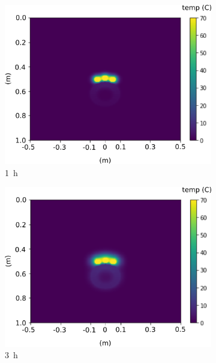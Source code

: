\documentclass[Journal,letterpaper,InsideFigs]{ascelike-new}
\begin{document}
\begin{figure}
 \centering
 \begin{subfigure}[b]{0.49\textwidth}
    \includegraphics[width=\textwidth]{figs/time-evol/1h.png}
    \caption{\SI{1}{\hour}}
 \end{subfigure}             
 \begin{subfigure}[b]{0.49\textwidth}
    \includegraphics[width=\textwidth]{figs/time-evol/3h.png}
    \caption{\SI{3}{\hour}}
 \end{subfigure}\\           
 \begin{subfigure}[b]{0.49\textwidth}

\end{subfigure}
\end{figure}
\end{document}
